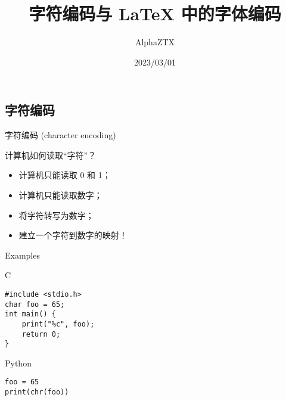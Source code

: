 \documentclass{beamer}
\title{字符编码与 \LaTeX{} 中的字体编码}
\author{AlphaZTX}
\date{2023/03/01}
\begin{document}
\maketitle

\begin{frame}
\section{字符编码}
\end{frame}

\begin{frame}{字符编码 (character encoding)}
\begin{exampleblock}{计算机如何读取“字符”？}\pause
\begin{itemize}%
\item 计算机只能读取 0 和 1；
\item 计算机只能读取数字；
\item 将字符转写为数字；%
\item 建立一个字符到数字的映射！
\end{itemize}
\end{exampleblock}
\end{frame}

\begin{frame}[fragile]{Examples}
\begin{exampleblock}{C}
\begin{verbatim}
#include <stdio.h>
char foo = 65;
int main() {
    print("%c", foo);
    return 0;
}
\end{verbatim}
\end{exampleblock}
\begin{exampleblock}{Python}
\begin{verbatim}
foo = 65
print(chr(foo))
\end{verbatim}
\end{exampleblock}
\end{frame}
\end{document}
